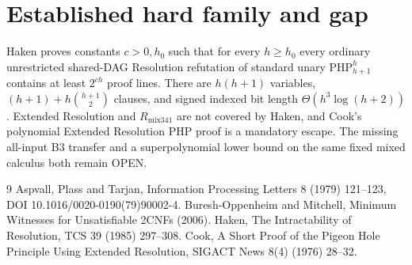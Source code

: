 \documentclass{article}
\begin{document}
\section*{Established hard family and gap}
Haken proves constants $c>0,h_0$ such that for every $h\ge h_0$ every ordinary unrestricted shared-DAG Resolution refutation of standard unary $\mathrm{PHP}_{h+1}^h$ contains at least $2^{ch}$ proof lines. There are $h(h+1)$ variables, $(h+1)+h\binom{h+1}{2}$ clauses, and signed indexed bit length $\Theta(h^3\log(h+2))$. Extended Resolution and $R_{\mathrm{mix341}}$ are not covered by Haken, and Cook's polynomial Extended Resolution PHP proof is a mandatory escape. The missing all-input B3 transfer and a superpolynomial lower bound on the same fixed mixed calculus both remain OPEN.
\begin{thebibliography}{9}
 Aspvall, Plass and Tarjan, Information Processing Letters 8 (1979) 121--123, DOI 10.1016/0020-0190(79)90002-4.
 Buresh-Oppenheim and Mitchell, Minimum Witnesses for Unsatisfiable 2CNFs (2006).
 Haken, The Intractability of Resolution, TCS 39 (1985) 297--308.
 Cook, A Short Proof of the Pigeon Hole Principle Using Extended Resolution, SIGACT News 8(4) (1976) 28--32.
\end{thebibliography}
\end{document}
